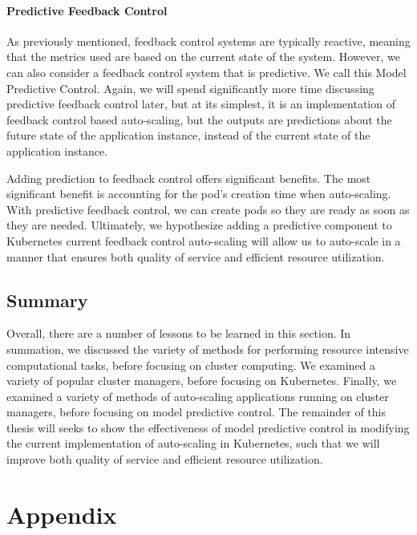 \documentclass[twoside]{report}
\begin{document}
\subsubsection{Predictive Feedback Control}

As previously mentioned, feedback control systems are typically reactive,
meaning that the metrics used are based on the current state of the system.
However, we can also consider a feedback control system that is predictive. We
call this Model Predictive Control.\cite[pg.
27]{auto-scaling-techniques-for-elastic-applications-in-cloud-environments}
Again, we will spend significantly more time discussing predictive feedback
control later, but at its simplest, it is an implementation of feedback control
based auto-scaling, but the outputs are predictions about the future state of
the application instance, instead of the current state of the application instance.

Adding prediction to feedback control offers significant benefits. The most
significant benefit is accounting for the pod's creation time when auto-scaling.
With predictive feedback control, we can create pods so they are ready as soon
as they are needed. Ultimately, we hypothesize adding a predictive component to
Kubernetes current feedback control auto-scaling will allow us to auto-scale in
a manner that ensures both quality of service and efficient resource
utilization.

\section{Summary}

Overall, there are a number of lessons to be learned in this section. In
summation, we discussed the variety of methods for performing resource intensive
computational tasks, before focusing on cluster computing. We examined a variety
of popular cluster managers, before focusing on Kubernetes. Finally, we examined
a variety of methods of auto-scaling applications running on cluster managers,
before focusing on model predictive control. The remainder of this thesis will
seeks to show the effectiveness of model predictive control in modifying the
current implementation of auto-scaling in Kubernetes, such that we will improve
both quality of service and efficient resource utilization.

\chapter{Appendix}
\end{document}
